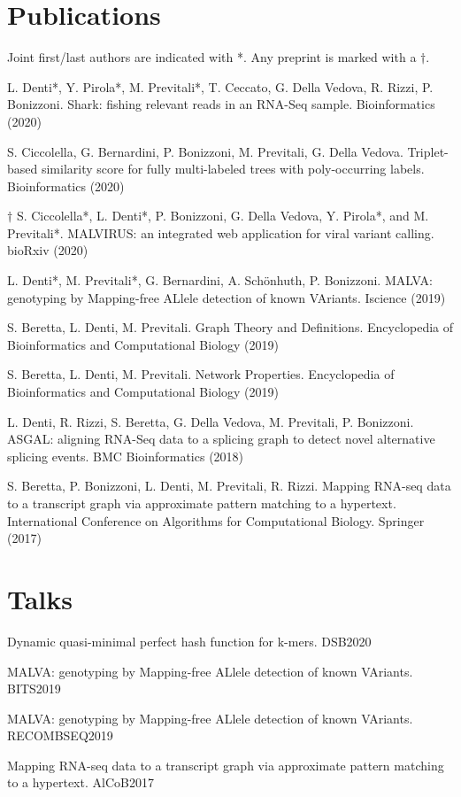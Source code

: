 \documentclass[letterpaper,11pt]{article}
\begin{document}
\section{Publications}
Joint first/last authors are indicated with *. Any preprint is marked with a \(\dagger\).
{\small
\begin{etaremune}
    \item L. Denti*, Y. Pirola*, M. Previtali*, T. Ceccato, G. Della Vedova, R. Rizzi, P. Bonizzoni. Shark: fishing relevant reads in an RNA-Seq sample. Bioinformatics (2020)
   
    \item S. Ciccolella, G. Bernardini, P. Bonizzoni, M. Previtali, G. Della Vedova. Triplet-based similarity score for fully multi-labeled trees with poly-occurring labels. Bioinformatics (2020)

    \item \(\dagger\) S. Ciccolella*, L. Denti*, P. Bonizzoni, G. Della Vedova, Y. Pirola*, and M. Previtali*. MALVIRUS: an integrated web application for viral variant calling. bioRxiv (2020)
   
    \item L. Denti*, M. Previtali*, G. Bernardini, A. Sch\"{o}nhuth, P. Bonizzoni. MALVA: genotyping by Mapping-free ALlele detection of known VAriants. Iscience (2019)
   
    \item S. Beretta, L. Denti, M. Previtali. Graph Theory and Definitions. Encyclopedia of Bioinformatics and Computational Biology (2019)
   
    \item S. Beretta, L. Denti, M. Previtali. Network Properties. Encyclopedia of Bioinformatics and Computational Biology (2019)
   
    \item L. Denti, R. Rizzi, S. Beretta, G. Della Vedova, M. Previtali, P. Bonizzoni. ASGAL: aligning RNA-Seq data to a splicing graph to detect novel alternative splicing events. BMC Bioinformatics (2018)
    
    \item S. Beretta, P. Bonizzoni, L. Denti, M. Previtali, R. Rizzi. Mapping RNA-seq data to a transcript graph via approximate pattern matching to a hypertext. International Conference on Algorithms for Computational Biology. Springer (2017)
\end{etaremune}
}

\section{Talks}
{\small
\begin{etaremune}
    \item Dynamic quasi-minimal perfect hash function for k-mers. DSB2020
    \item MALVA: genotyping by Mapping-free ALlele detection of known VAriants. BITS2019
    \item MALVA: genotyping by Mapping-free ALlele detection of known VAriants. RECOMBSEQ2019
    \item Mapping RNA-seq data to a transcript graph via approximate pattern matching to a hypertext. AlCoB2017
\end{etaremune}
}
\end{document}
